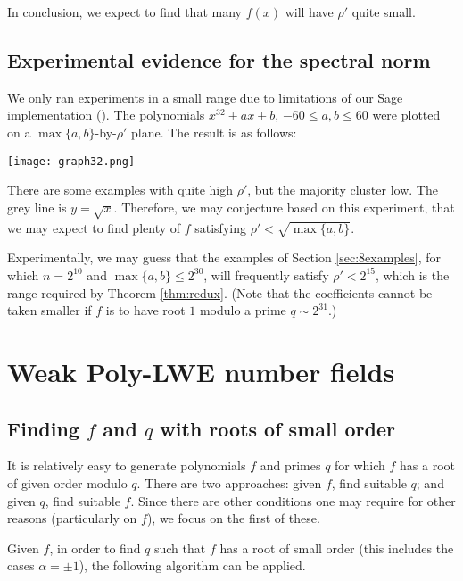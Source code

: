 \documentclass{llncs}
\newcommand{\<}{\langle}
\renewcommand{\>}{\rangle}
\begin{document}
In conclusion, we expect to find that many $f(x)$ will have $\rho'$ quite small.



\subsection{Experimental evidence for the spectral norm}

        We only ran experiments in a small range due to limitations of our  Sage implementation (\cite{S}).  The polynomials $x^{32}+ax+b$, $-60 \le a,b \le 60$ were plotted on a $\max\{a,b\}$-by-$\rho'$ plane.  The result is as follows:

        \begin{center}
                \texttt{[image: graph32.png]}
        \end{center}

        There are some examples with quite high $\rho'$, but the majority cluster low.  The grey line is $y=\sqrt{x}$.  Therefore, we may conjecture based on this experiment, that we may expect to find plenty of $f$ satisfying
$\rho' < \sqrt{\max\{a,b\}}$.

Experimentally, we may guess that the examples of Section \ref{sec:8examples}, for which $n = 2^{10}$ and $\max\{a,b\} \le 2^{30}$, will frequently satisfy $\rho' < 2^{15}$, which is the range required by Theorem \ref{thm:redux}.  (Note that the coefficients cannot be taken smaller if $f$ is to have root $1$ modulo a prime $q \sim 2^{31}$.)



\section{Weak Poly-LWE number fields}
\label{sec:ex1}

\subsection{Finding $f$ and $q$ with roots of small order}
\label{sec:q}

It is relatively easy to generate polynomials $f$ and primes $q$ for which $f$ has a root of given order modulo $q$.  There are two approaches:  given $f$, find suitable $q$; and given $q$, find suitable $f$.  Since there are other conditions one may require for other reasons (particularly on $f$), we focus on the first of these.

Given $f$, in order to find $q$ such that $f$ has a root of small order (this includes the cases $\alpha = \pm 1$), the following algorithm can be applied.
\end{document}
